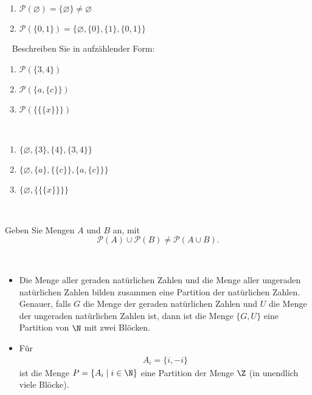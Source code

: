 \begin{example}
\begin{enumerate}
\item $\mathcal{P}(\varnothing)=\{\varnothing\}\neq \varnothing$
\item $\mathcal{P}(\{0,1\})=\big\{ \varnothing,\{0\},\{1\},\{0,1\} \big\}$
\end{enumerate}
\end{example}

\begin{example}~
Beschreiben Sie in aufzählender Form:
\begin{enumerate}
\item $\mathcal{P}(\{3,4\})$
\item $\mathcal{P}(\{a,\{c\}\})$
\item $\mathcal{P}(\{\{\{x\}\}\})$
\end{enumerate}
\end{example}
\begin{example}
{~
	\begin{enumerate}
	\item $ \{\varnothing, \{3\}, \{4\}, \{3, 4\}\} $
	\item $ \{\varnothing, \{a\}, \{\{c\}\}, \{a, \{c\}\}\} $
	\item $ \{\varnothing, \{\{\{x\}\}\}\} $
	\end{enumerate}
}
{~
\answerspace{4cm}
}
\end{example}

\begin{example}
Geben Sie Mengen $A$ und $B$ an, mit
\[
\mathcal{P}(A)\cup\mathcal{P}(B)\neq\mathcal{P}(A\cup B).
\]
\end{example}
\begin{example}
\end{example}

\begin{example}~
\begin{itemize}
    \item Die Menge aller geraden natürlichen Zahlen und die Menge aller ungeraden natürlichen Zahlen bilden zusammen eine Partition der natürlichen Zahlen. Genauer, falls $G$ die Menge der geraden natürlichen Zahlen und $U$ die Menge der ungeraden natürlichen Zahlen ist, dann ist die Menge $\{G,U\}$ eine Partition von $\N$ mit zwei Blöcken.
    \item Für
    \begin{align*}
    A_i=\{i,-i\}
    \end{align*}
    ist die Menge $P=\{A_i\mid i\in\N\}$ eine Partition der Menge $\Z$ (in unendlich viele Blöcke).
\end{itemize}
\end{example}

